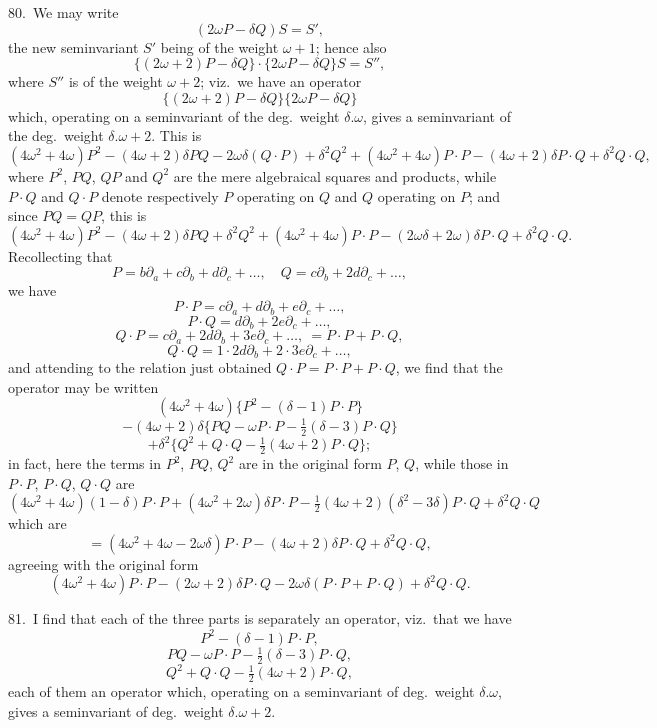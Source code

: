 \documentclass[11pt]{article}
\begin{document}
80.\ We may write
\[
(2\omega P - \delta Q) S = S',
\]
the new seminvariant $S'$ being of the weight $\omega + 1$; hence also
\[
\{(2\omega + 2)P - \delta Q\} \cdot \{2\omega P - \delta Q\} S = S'',
\]
where $S''$ is of the weight $\omega + 2$; viz.\ we have an operator
\[
\{(2\omega + 2) P - \delta Q\}\{2\omega P - \delta Q\}
\]
which, operating on a seminvariant of the deg.\ weight $\delta . \omega$, gives a seminvariant of the deg.\ weight $\delta . \omega + 2$. This is
\[
(4\omega^2 + 4\omega) P^2 - (4\omega + 2)\delta PQ - 2\omega\delta(Q \cdot P) + \delta^2 Q^2 + (4\omega^2 + 4\omega) P \cdot P - (4\omega + 2)\delta P \cdot Q + \delta^2 Q \cdot Q,
\]
where $P^2$, $PQ$, $QP$ and $Q^2$ are the mere algebraical squares and products, while $P \cdot Q$ and $Q \cdot P$ denote respectively $P$ operating on $Q$ and $Q$ operating on $P$; and since $PQ = QP$, this is
\[
(4\omega^2 + 4\omega) P^2 - (4\omega + 2)\delta PQ + \delta^2 Q^2 + (4\omega^2 + 4\omega) P \cdot P - (2\omega \delta + 2\omega)\delta P \cdot Q + \delta^2 Q \cdot Q.
\]
Recollecting that
\[
P = b\partial_a + c\partial_b + d\partial_c + \ldots,\quad Q = c\partial_b + 2d\partial_c + \ldots,
\]
we have
\[
P \cdot P = c\partial_a + d\partial_b + e\partial_c + \ldots,
\]
\[
P \cdot Q = d\partial_b + 2e\partial_c + \ldots,
\]
\[
Q \cdot P = c\partial_a + 2d\partial_b + 3e\partial_c + \ldots,\ = P \cdot P + P \cdot Q,
\]
\[
Q \cdot Q = 1 \cdot 2 d\partial_b + 2 \cdot 3 e\partial_c + \ldots,
\]
and attending to the relation just obtained $Q \cdot P = P \cdot P + P \cdot Q$, we find that the operator may be written
\[
(4\omega^2 + 4\omega)\{P^2 - (\delta - 1) P \cdot P\}
\]
\[
- (4\omega + 2)\delta \{PQ - \omega P \cdot P - \tfrac{1}{2}(\delta - 3) P \cdot Q\}
\]
\[
+ \delta^2 \{Q^2 + Q \cdot Q - \tfrac{1}{2}(4\omega + 2) P \cdot Q\};
\]
in fact, here the terms in $P^2$, $PQ$, $Q^2$ are in the original form $P$, $Q$, while those in $P \cdot P$, $P \cdot Q$, $Q \cdot Q$ are
\[
(4\omega^2 + 4\omega)(1 - \delta) P \cdot P + (4\omega^2 + 2\omega)\delta P \cdot P - \tfrac{1}{2}(4\omega + 2)(\delta^2 - 3\delta) P \cdot Q + \delta^2 Q \cdot Q
\]
which are
\[
= (4\omega^2 + 4\omega - 2\omega\delta) P \cdot P - (4\omega + 2)\delta P \cdot Q + \delta^2 Q \cdot Q,
\]
agreeing with the original form
\[
(4\omega^2 + 4\omega) P \cdot P - (2\omega + 2)\delta P \cdot Q - 2\omega\delta (P \cdot P + P \cdot Q) + \delta^2 Q \cdot Q.
\]

\clearpage
81.\ I find that each of the three parts is separately an operator, viz.\ that we have
\[
P^2 - (\delta - 1) P \cdot P,
\]
\[
PQ - \omega P \cdot P - \tfrac{1}{2}(\delta - 3) P \cdot Q,
\]
\[
Q^2 + Q \cdot Q - \tfrac{1}{2}(4\omega + 2) P \cdot Q,
\]
each of them an operator which, operating on a seminvariant of deg.\ weight $\delta . \omega$, gives a seminvariant of deg.\ weight $\delta . \omega + 2$.
\end{document}
